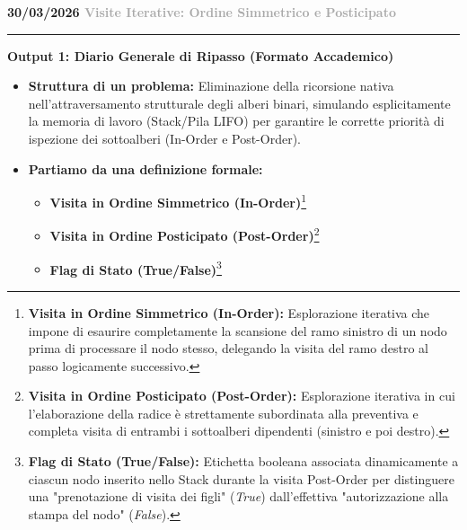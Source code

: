 \documentclass[a4paper, 11pt]{report}
\newcommand{\lezione}[2]{
\vspace{2em}
\noindent\textbf{\Large #1 \hfill \textcolor{darkgray}{#2}}
\vspace{0.5em}
\hrule
\vspace{1.5em}
}
\newcommand{\definizione}[2]{%
\textbf{#1}\footnote{\textbf{#1:} #2}%
}
\begin{document}
\lezione{30/03/2026}{Visite Iterative: Ordine Simmetrico e Posticipato}

\vspace{0.5cm}
\textbf{Output 1: Diario Generale di Ripasso (Formato Accademico)}

\begin{itemize}
    \item \textbf{Struttura di un problema:}
    Eliminazione della ricorsione nativa nell'attraversamento strutturale degli alberi binari, simulando esplicitamente la memoria di lavoro (Stack/Pila LIFO) per garantire le corrette priorità di ispezione dei sottoalberi (In-Order e Post-Order).

    \item \textbf{Partiamo da una definizione formale:}
    \begin{itemize}
        \item \definizione{Visita in Ordine Simmetrico (In-Order)}{Esplorazione iterativa che impone di esaurire completamente la scansione del ramo sinistro di un nodo prima di processare il nodo stesso, delegando la visita del ramo destro al passo logicamente successivo.}
        \item \definizione{Visita in Ordine Posticipato (Post-Order)}{Esplorazione iterativa in cui l'elaborazione della radice è strettamente subordinata alla preventiva e completa visita di entrambi i sottoalberi dipendenti (sinistro e poi destro).}
        \item \definizione{Flag di Stato (True/False)}{Etichetta booleana associata dinamicamente a ciascun nodo inserito nello Stack durante la visita Post-Order per distinguere una "prenotazione di visita dei figli" (\textit{True}) dall'effettiva "autorizzazione alla stampa del nodo" (\textit{False}).}
    \end{itemize}


\end{itemize}
\end{document}
